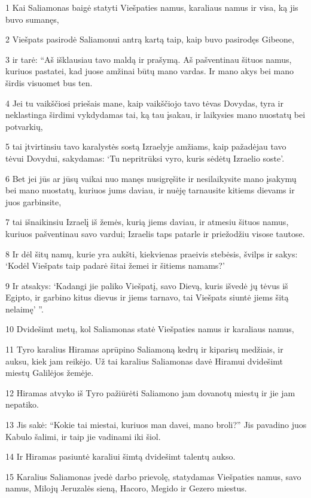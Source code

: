 \par 1 Kai Saliamonas baigė statyti Viešpaties namus, karaliaus namus ir visa, ką jis buvo sumanęs, 
\par 2 Viešpats pasirodė Saliamonui antrą kartą taip, kaip buvo pasirodęs Gibeone, 
\par 3 ir tarė: “Aš išklausiau tavo maldą ir prašymą. Aš pašventinau šituos namus, kuriuos pastatei, kad juose amžinai būtų mano vardas. Ir mano akys bei mano širdis visuomet bus ten. 
\par 4 Jei tu vaikščiosi priešais mane, kaip vaikščiojo tavo tėvas Dovydas, tyra ir neklastinga širdimi vykdydamas tai, ką tau įsakau, ir laikysies mano nuostatų bei potvarkių, 
\par 5 tai įtvirtinsiu tavo karalystės sostą Izraelyje amžiams, kaip pažadėjau tavo tėvui Dovydui, sakydamas: ‘Tu nepritrūksi vyro, kuris sėdėtų Izraelio soste’. 
\par 6 Bet jei jūs ar jūsų vaikai nuo manęs nusigręšite ir nesilaikysite mano įsakymų bei mano nuostatų, kuriuos jums daviau, ir nuėję tarnausite kitiems dievams ir juos garbinsite, 
\par 7 tai išnaikinsiu Izraelį iš žemės, kurią jiems daviau, ir atmesiu šituos namus, kuriuos pašventinau savo vardui; Izraelis taps patarle ir priežodžiu visose tautose. 
\par 8 Ir dėl šitų namų, kurie yra aukšti, kiekvienas praeivis stebėsis, švilps ir sakys: ‘Kodėl Viešpats taip padarė šitai žemei ir šitiems namams?’ 
\par 9 Ir atsakys: ‘Kadangi jie paliko Viešpatį, savo Dievą, kuris išvedė jų tėvus iš Egipto, ir garbino kitus dievus ir jiems tarnavo, tai Viešpats siuntė jiems šitą nelaimę’ ”. 
\par 10 Dvidešimt metų, kol Saliamonas statė Viešpaties namus ir karaliaus namus, 
\par 11 Tyro karalius Hiramas aprūpino Saliamoną kedrų ir kiparisų medžiais, ir auksu, kiek jam reikėjo. Už tai karalius Saliamonas davė Hiramui dvidešimt miestų Galilėjos žemėje. 
\par 12 Hiramas atvyko iš Tyro pažiūrėti Saliamono jam dovanotų miestų ir jie jam nepatiko. 
\par 13 Jis sakė: “Kokie tai miestai, kuriuos man davei, mano broli?” Jis pavadino juos Kabulo šalimi, ir taip jie vadinami iki šiol. 
\par 14 Ir Hiramas pasiuntė karaliui šimtą dvidešimt talentų aukso. 
\par 15 Karalius Saliamonas įvedė darbo prievolę, statydamas Viešpaties namus, savo namus, Milojų Jeruzalės sieną, Hacoro, Megido ir Gezero miestus. 
